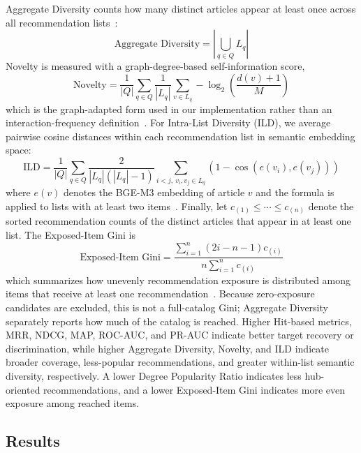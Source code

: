 \documentclass[runningheads]{llncs}
\begin{document}
Aggregate Diversity counts how many distinct articles appear at least once
across all recommendation lists~\cite{mansoury2020fairmatch,zhao2025fairnessdiversity}:
\begin{equation}
\text{Aggregate Diversity} = \left| \bigcup_{q \in Q} L_q \right|
\end{equation}
Novelty is measured with a graph-degree-based self-information score,
\begin{equation}
\text{Novelty} =
\frac{1}{|Q|}\sum_{q \in Q}\frac{1}{|L_q|}\sum_{v \in L_q}
-\log_2\left(\frac{d(v)+1}{M}\right)
\end{equation}
which is the graph-adapted form used in our implementation rather than an
interaction-frequency definition~\cite{vargas2011novelty}. For
Intra-List Diversity (ILD), we average pairwise cosine distances within each
recommendation list in semantic embedding space:
\begin{equation}
\text{ILD} =
\frac{1}{|Q|}\sum_{q \in Q}
\frac{2}{|L_q|(|L_q|-1)}
\sum_{i<j,\ v_i,v_j \in L_q}
\left(1-\cos(e(v_i), e(v_j))\right)
\end{equation}
where \(e(v)\) denotes the BGE-M3 embedding of article \(v\) and the formula is
applied to lists with at least two items~\cite{zhao2025fairnessdiversity}.
Finally, let \(c_{(1)} \le \cdots \le c_{(n)}\) denote the sorted recommendation
counts of the distinct articles that appear in at least one list. The
Exposed-Item Gini is
\begin{equation}
\text{Exposed-Item Gini} =
\frac{\sum_{i=1}^{n}(2i-n-1)c_{(i)}}
{n\sum_{i=1}^{n} c_{(i)}}
\end{equation}
which summarizes how unevenly recommendation exposure is distributed among
items that receive at least one recommendation~\cite{zhao2025fairnessdiversity}.
Because zero-exposure candidates are excluded, this is not a full-catalog Gini;
Aggregate Diversity separately reports how much of the catalog is reached.
Higher Hit-based metrics, MRR, NDCG, MAP, ROC-AUC, and PR-AUC indicate better
target recovery or discrimination, while higher Aggregate Diversity, Novelty,
and ILD indicate broader coverage, less-popular recommendations, and greater
within-list semantic diversity, respectively. A lower Degree Popularity Ratio
indicates less hub-oriented recommendations, and a lower Exposed-Item Gini
indicates more even exposure among reached items.



\subsection{Results}
\end{document}
